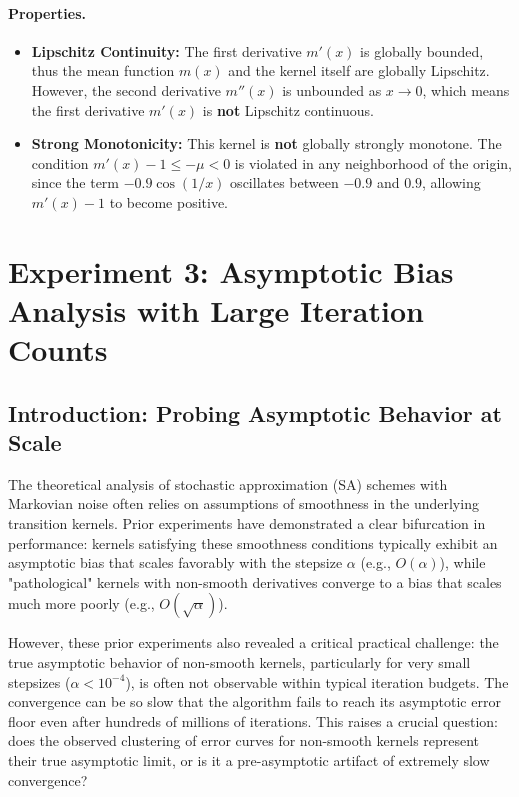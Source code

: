 \documentclass[a4paper]{article}
\begin{document}
\paragraph{Properties.}
\begin{itemize}
	\item \textbf{Lipschitz Continuity:} The first derivative $m'(x)$ is globally bounded, thus the mean function $m(x)$ and the kernel itself are globally Lipschitz. However, the second derivative $m''(x)$ is unbounded as $x \to 0$, which means the first derivative $m'(x)$ is \textbf{not} Lipschitz continuous.
	\item \textbf{Strong Monotonicity:} This kernel is \textbf{not} globally strongly monotone. The condition $m'(x) - 1 \le -\mu < 0$ is violated in any neighborhood of the origin, since the term $-0.9\cos(1/x)$ oscillates between $-0.9$ and $0.9$, allowing $m'(x)-1$ to become positive.
\end{itemize}

\section*{Experiment 3: Asymptotic Bias Analysis with Large Iteration Counts}

\subsection*{Introduction: Probing Asymptotic Behavior at Scale}
The theoretical analysis of stochastic approximation (SA) schemes with Markovian noise often relies on assumptions of smoothness in the underlying transition kernels. Prior experiments have demonstrated a clear bifurcation in performance: kernels satisfying these smoothness conditions typically exhibit an asymptotic bias that scales favorably with the stepsize $\alpha$ (e.g., $O(\alpha)$), while "pathological" kernels with non-smooth derivatives converge to a bias that scales much more poorly (e.g., $O(\sqrt{\alpha})$).

However, these prior experiments also revealed a critical practical challenge: the true asymptotic behavior of non-smooth kernels, particularly for very small stepsizes ($\alpha < 10^{-4}$), is often not observable within typical iteration budgets. The convergence can be so slow that the algorithm fails to reach its asymptotic error floor even after hundreds of millions of iterations. This raises a crucial question: does the observed clustering of error curves for non-smooth kernels represent their true asymptotic limit, or is it a pre-asymptotic artifact of extremely slow convergence?
\end{document}
